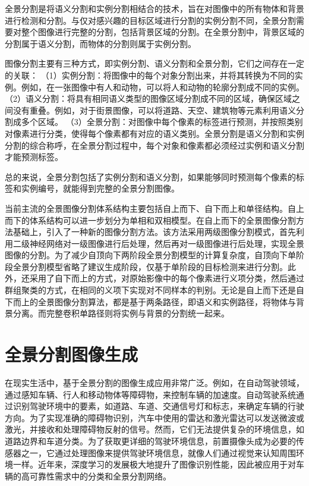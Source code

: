 全景分割是将语义分割和实例分割相结合的技术，旨在对图像中的所有物体和背景进行检测和分割\cite{he2017mask}。与仅对感兴趣的目标区域进行分割的实例分割不同，全景分割需要对整个图像进行完整的分割，包括背景区域的分割。在全景分割中，背景区域的分割属于语义分割，而物体的分割则属于实例分割\cite{wu2019wider}。

图像分割主要有三种方式，即实例分割、语义分割和全景分割，它们之间存在一定的关联：
（1）实例分割：将图像中的每个对象分割出来，并将其转换为不同的实例。例如，在一张图像中有人和动物，可以将人和动物的轮廓分割成不同的实例\cite{he2017mask}。
（2）语义分割：将具有相同语义类型的图像区域分割成不同的区域，确保区域之间没有重叠。例如，对于街景图像，可以将道路、天空、建筑物等元素利用语义分割成多个区域\cite{long2015fully}。
（3）全景分割：对图像中每个像素的标签进行预测，并按照类别对像素进行分类，使得每个像素都有对应的语义类别。全景分割是语义分割和实例分割的综合称呼，在全景分割过程中，每个对象和像素都必须经过实例和语义分割才能预测标签。

总的来说，全景分割包括了实例分割和语义分割，如果能够同时预测每个像素的标签和实例编号，就能得到完整的全景分割图像。

当前主流的全景图像分割体系结构主要包括自上而下、自下而上和单径结构。自上而下的体系结构可以进一步划分为单相和双相模型\cite{he2017mask}。在自上而下的全景图像分割方法基础上，引入了一种新的图像分割方法。该方法采用两级图像分割模式，首先利用二级神经网络对一级图像进行后处理，然后再对一级图像进行后处理，实现全景图像的分割。为了减少自顶向下两阶段全景分割模型的计算复杂度，自顶向下单阶段全景分割模型省略了建议生成阶段，仅基于单阶段的目标检测来进行分割。此外，还采用了自下而上的方式，对原始影像中的每个像素进行义项分类，然后通过群组聚类的方式，在相同的义项下实现对不同样本的判别。无论是自上而下还是自下而上的全景图像分割算法，都是基于两条路径，即语义和实例路径，将物体与背景分离。而完整卷积单路径则将实例与背景的分割统一起来。

\section{全景分割图像生成}
在现实生活中，基于全景分割的图像生成应用非常广泛。例如，在自动驾驶领域，通过感知车辆、行人和移动物体等障碍物，来控制车辆的加速度。自动驾驶系统通过识别驾驶环境中的要素，如道路、车道、交通信号灯和标志，来确定车辆的行驶方向。为了实现准确的障碍物识别，汽车中使用的雷达和激光雷达可以发送微波或激光，并接收和处理障碍物反射的信号。然而，它们无法提供复杂的环境信息，如道路边界和车道分类。为了获取更详细的驾驶环境信息，前置摄像头成为必要的传感器之一，它通过处理图像来提供驾驶环境信息，就像人们通过视觉来认知周围环境一样。近年来，深度学习的发展极大地提升了图像识别性能，因此被应用于对车辆的高可靠性需求中的分类和全景分割网络。

